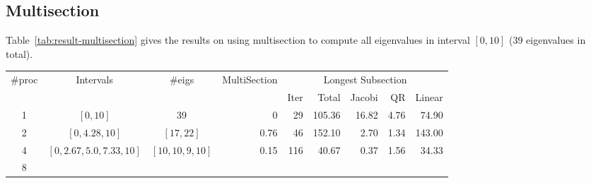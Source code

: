 \subsection{Multisection}
Table~\ref{tab:result-multisection} gives the results on using multisection to compute all eigenvalues in interval $[0, 10]$ (39 eigenvalues in total).
\begin{table*}
\begin{center}
\begin{tabular}{|c | c | c | r | r | r | r | r | r |}
\hline
$\#$proc & Intervals & $\#$eigs & MultiSection & \multicolumn{5}{|c|}{Longest Subsection} \\
  & & &  & Iter & Total & Jacobi & QR & Linear \\
\hline
1 & $[0, 10]$ & 39 & 0 & 29 & 105.36 & 16.82 & 4.76 & 74.90 \\
2 & $[0, 4.28, 10]$ & $[17, 22]$ & 0.76 &  46 & 152.10 & 2.70 & 1.34 & 143.00\\
4 & $[0, 2.67, 5.0, 7.33, 10]$ & $[10, 10, 9, 10]$ & 0.15 & 116 & 40.67 & 0.37 & 1.56 & 34.33 \\
8 & & & & \\
\hline
\end{tabular}
\caption{Multisection result on $[0, 10]$.}
\label{tab:result-multisection}
\end{center}
\end{table*}


